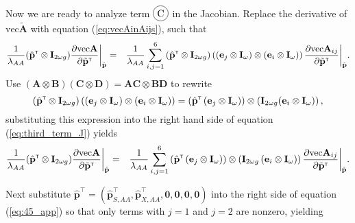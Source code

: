\documentclass[11pt]{article}
\newcommand*\circled[1]{\tikz[baseline=(char.base)]{
            \node[shape=circle,draw,inner sep=2pt] (char) {#1};}}
\def\mbf#1{\mathbf{#1}}
\newcommand{\bo}[1]{{\bf #1}}
\newcommand{\tr}{{\mbox{\tiny \sf T}}}
\begin{document}
Now we are ready to analyze term $\circled{C}$ in the Jacobian. Replace the derivative of $\mbox{vec} \tilde{\mathbf{A}}$ with equation (\ref{eq:vecAinAijs}), such that 
\begin{eqnarray}
  \frac{1}{\lambda_{AA}}(\hat{\bo p}^\tr \otimes  \mathbf{I}_{2\omega g})\frac{\partial \mbox{vec} \mathbf{A}}{\partial \tilde{\bo p}^\tr}\bigg\rvert_{\hat{\bo p}}&=&\frac{1}{\lambda_{AA}}\sum_{i,j=1}^{6} \left(\hat{\bo p}^\tr \otimes \mathbf{I}_{2\omega g}\right)\left(\left(\mathbf{e}_{j} \otimes \mathbf{I}_\omega\right) \otimes \left(\mathbf{e}_{i} \otimes \mathbf{I}_\omega\right) \right)\frac{\partial \mbox{vec} \mathbf{A}_{ij}}{\partial \tilde{\bo p}^\tr}\bigg\rvert_{\hat{\bo p}}.\nonumber\\ \label{eq:third_term_J}
\end{eqnarray}
Use $(\mathbf{A} \otimes \mathbf{B}) (\mathbf{C} \otimes \mathbf{D})= \mathbf{A} \mathbf{C}\otimes \mathbf{B} \mathbf{D}$ to rewrite  
\begin{equation}
  \left(\hat{\bo p}^\tr \otimes  \mathbf{I}_{2\omega g}\right) \left(\left(\mathbf{e}_{j} \otimes \mathbf{I}_\omega\right) \otimes \left(\mathbf{e}_{i} \otimes \mathbf{I}_\omega\right)\right)= \left(\hat{\bo p}^\tr \left(\mathbf{e}_{j} \otimes \mathbf{I}_\omega\right) \right) \otimes  \left(\mathbf{I}_{2\omega g} (\mathbf{e}_{i} \otimes \mathbf{I}_\omega) \right), \label{eq:rewrite_kron_four_matrices}
\end{equation}
substituting this expression into the right hand side of equation (\ref{eq:third_term_J}) yields
\begin{eqnarray}
\frac{1}{\lambda_{AA}}(\hat{\mathbf{p}}^\tr \otimes \mathbf{I}_{2\omega g})\frac{\partial \mbox{vec} \mathbf{A}}{\partial \tilde{\bo p}^\tr}\bigg\rvert_{\hat{\bo p}}&=&\frac{1}{\lambda_{AA}}\sum_{i,j=1}^{6} \left(\hat{\bo p}^\tr \left(\mathbf{e}_{j} \otimes \mathbf{I}_\omega\right)\right)\otimes \left( \mathbf{I}_{2\omega g} \left(\mathbf{e}_{i} \otimes \mathbf{I}_\omega\right)\right) \frac{\partial \mbox{vec} \mathbf{A}_{ij}}{\partial \tilde{\bo p}^\tr}\bigg\rvert_{\hat{\bo p}}.\nonumber\\ \label{eq:45_app}
\end{eqnarray}


Next substitute $\hat{\mbf{p}}^{\intercal} = \left( \hat{\mbf{p}}^{\intercal}_{S,AA},\hat{\mbf{p}}^{\intercal}_{X,AA},\mbf{0},\mbf{0},\mbf{0},\mbf{0} \right)$ into the right side of equation (\ref{eq:45_app}) so that only terms with $j=1$ and $j=2$ are nonzero, yielding
\end{document}
